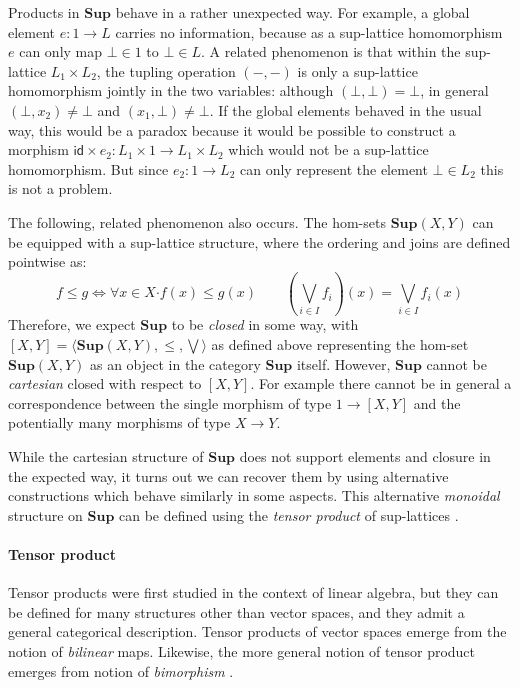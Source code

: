 \documentclass[11pt,oneside,draft]{book}
\theoremstyle{definition}
\newcommand{\kw}[1]{\ensuremath{ \mathsf{#1} }}
\newcommand{\bdot}{\boldsymbol{\cdot}}
\begin{document}
Products in $\mathbf{Sup}$
behave in a rather unexpected way.
For example,
a global element $e : 1 \rightarrow L$
carries no information,
because as a sup-lattice homomorphism $e$
can only map $\bot \in 1$ to $\bot \in L$.
A related phenomenon is that
within the sup-lattice $L_1 \times L_2$,
the tupling operation $(-, -)$
is only a sup-lattice homomorphism
jointly in the two variables:
although $(\bot, \bot) = \bot$,
in general $(\bot, x_2) \ne \bot$ and $(x_1, \bot) \ne \bot$.
If the global elements behaved in the usual way,
this would be a paradox because
it would be possible to construct a morphism
$\kw{id} \times e_2 : L_1 \times 1 \rightarrow L_1 \times L_2$
which would not be a sup-lattice homomorphism.
But since $e_2 : 1 \rightarrow L_2$
can only represent the element $\bot \in L_2$
this is not a problem.

The following, related phenomenon also occurs.
The hom-sets $\mathbf{Sup}(X, Y)$
can be equipped with a sup-lattice structure,
where the ordering and joins are defined pointwise as:
\[
  f \le g \Leftrightarrow \forall x \in X \bdot f(x) \le g(x)
  \qquad
  \left( \bigvee_{i \in I} f_i \right)(x) = \bigvee_{i \in I} f_i(x)
\]
Therefore,
we expect $\mathbf{Sup}$
to be \emph{closed} in some way, with
$[X, Y] = \langle \mathbf{Sup}(X, Y), {\le}, {\bigvee} \rangle$
as defined above representing the hom-set
$\mathbf{Sup}(X, Y)$ as an object in the category $\mathbf{Sup}$ itself.
However,
$\mathbf{Sup}$ cannot be \emph{cartesian} closed
with respect to $[X, Y]$.
For example there cannot be in general
a correspondence between the single morphism of type
$1 \rightarrow [X, Y]$
and the potentially many morphisms of type
$X \rightarrow Y$.


While the cartesian structure of $\mathbf{Sup}$
does not support elements and closure in the
expected way,
it turns out we can recover them by using alternative constructions
which behave similarly in some aspects.
This alternative \emph{monoidal} structure on $\mathbf{Sup}$
can be defined using the \emph{tensor product}
of sup-lattices \citep[Chapter I]{egg}.

\paragraph{Tensor product} %

Tensor products were first studied in the context of linear algebra,
but they can be defined for many structures other than vector spaces,
and they admit a general categorical description.
Tensor products of vector spaces
emerge from the notion of \emph{bilinear} maps.
Likewise,
the more general notion of tensor product
emerges from notion of \emph{bimorphism} \citep{tpbm}.
\end{document}
